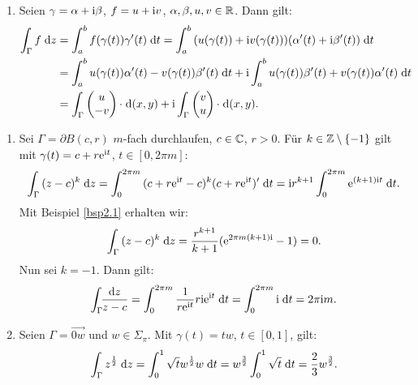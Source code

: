 \documentclass[a4paper,twoside,DIV15,BCOR12mm]{scrbook}
\begin{document}
\begin{bem}
\begin{enumerate}
\item Seien $\gamma = \alpha +\mathrm{i}\beta$, $f=u+\mathrm{i} v$, $\alpha,\beta,u,v\in\mathbb{R}$. Dann gilt:
\begin{align*}
\integral{\Gamma}{}{f}{z}&=\integral{a}{b}{f(\gamma(t))\gamma^\prime(t)}{t} = \integral{a}{b}{(u(\gamma(t))+\i v(\gamma(t)))(\alpha^\prime(t)+\i\beta^\prime(t))}{t}\\
&=\integral{a}{b}{u(\gamma(t))\alpha^\prime(t)-v(\gamma(t))\beta^\prime(t)}{t} + \i\integral{a}{b}{u(\gamma(t))\beta^\prime(t)+v(\gamma(t))\alpha^\prime(t)}{t}\\
&=\integral{\Gamma}{}{\cmplx{u}{-v}\cdot}{(x,y)}+\i\integral{\Gamma}{}{\cmplx{v}{u}\cdot}{(x,y)}.
\end{align*}
\end{enumerate}
\end{bem}

\begin{bsp}\label{bsp2.6}\begin{enumerate}
\item Sei $\Gamma = \partial B(c,r)$ $m$-fach durchlaufen, $c\in\mathbb{C}$, $r>0$. Für $k\in\mathbb{Z}\setminus\{-1\}$ gilt mit $\gamma(t) = c + r\mathrm{e}^{\mathrm{i} t}$, $t\in[0,2\pi m]$:
\[\int_{\Gamma}^{}{(z-c)^k}\;\mathrm{d} z = \int_{0}^{2\pi m}{(c+r\mathrm{e}^{\mathrm{i} t}-c)^k(c+r\mathrm{e}^{\mathrm{i} t})^\prime}\;\mathrm{d} t=\mathrm{i} r^{k+1}\int_{0}^{2\pi m}{\mathrm{e}^{(k+1)\mathrm{i} t}}\;\mathrm{d} t.\]
Mit Beispiel \ref{bsp2.1} erhalten wir:
\[\int_{\Gamma}^{}{(z-c)^k}\;\mathrm{d} z = \frac{r^{k+1}}{k+1}(\mathrm{e}^{2\pi m(k+1)\mathrm{i}}-1) = 0.\]
Nun sei $k=-1$. Dann gilt:
\[\int_\Gamma\!\!\frac{\mathrm{d}z}{z-c}=\int_{0}^{2\pi m}{\frac{1}{r\mathrm{e}^{\mathrm{i} t}}r\mathrm{i}\mathrm{e}^{\mathrm{i} t}}\;\mathrm{d} t=\int_{0}^{2\pi m}{\mathrm{i}}\;\mathrm{d} t = 2\pi\mathrm{i} m.\]

\item Seien $\Gamma = \overrightarrow{0w}$ und $w\in\Sigma_\pi$. Mit $\gamma(t)=tw$, $t\in[0,1]$, gilt:
\[\int_{\Gamma}^{}{z^\frac{1}{2}}\;\mathrm{d} z = \int_{0}^{1}{\sqrt{t}w^\frac{1}{2}w}\;\mathrm{d} t = w^\frac{3}{2}\int_{0}^{1}{\sqrt{t}}\;\mathrm{d} t = \frac{2}{3}w^\frac{3}{2}.\]
\end{enumerate}
\end{bsp}
\end{document}
